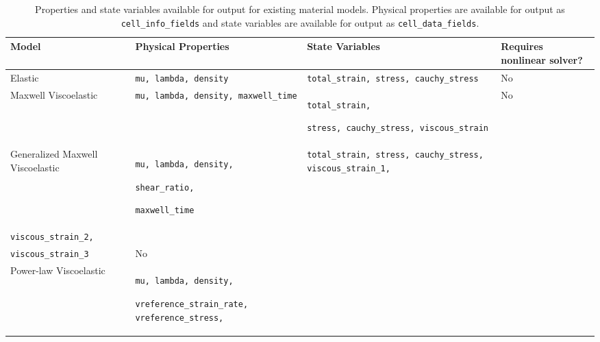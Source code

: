 \noindent \begin{center}
\begin{table}[H]
\centering{}\caption{\label{tab:material-model-output}Properties and state variables available
for output for existing material models. Physical properties are available
for output as \texttt{cell\_info\_fields} and state variables are
available for output as \texttt{cell\_data\_fields}.}
\begin{tabular}{|>{\centering}p{1.5in}|>{\centering}p{1.8in}|>{\centering}p{1.5in}|>{\centering}p{1in}|}
\hline 
\textbf{Model} & \textbf{Physical Properties} & \textbf{State Variables} & \textbf{Requires nonlinear solver?}\tabularnewline
\hline 
\hline 
Elastic & \texttt{mu, lambda, density} & \texttt{total\_strain, stress, cauchy\_stress} & No\tabularnewline
\hline 
Maxwell Viscoelastic & \texttt{mu, lambda, density, maxwell\_time} & \texttt{total\_strain,}

\texttt{stress, cauchy\_stress, viscous\_strain} & No\tabularnewline
\hline 
Generalized Maxwell Viscoelastic & \texttt{mu, lambda, density,}

\texttt{shear\_ratio,}

\texttt{maxwell\_time} & \texttt{total\_strain, stress, cauchy\_stress, viscous\_strain\_1,}~\\
\texttt{viscous\_strain\_2,}~\\
\texttt{viscous\_strain\_3} & No\tabularnewline
\hline 
Power-law Viscoelastic & \texttt{mu, lambda, density,}

\texttt{vreference\_strain\_rate, vreference\_stress,}


\end{tabular}
\end{table}
\end{center}
